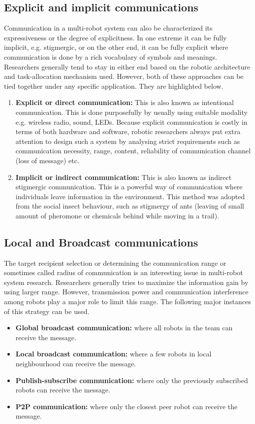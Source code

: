 \subsection*{Explicit and implicit communications}
Communication in a multi-robot system can also be characterized its expressiveness or the degree of explicitness. In one extreme it can be fully implicit, e.g. stigmergic, or on the other end, it can be fully explicit where communication is done by a rich vocabulary of symbols and meanings. Researchers generally tend to stay in either end based on the robotic architecture and task-allocation mechanism used. However, both of these approaches can be tied together under any specific application. They are highlighted below.
\begin{enumerate}
\item \textbf{Explicit or direct communication: }
This is also known as intentional communication. This is done purposefully by usually using suitable modality e.g. wireless radio, sound, LEDs. Because explicit communication is costly in terms of both hardware and software, robotic researchers always put extra attention to design such a system by analysing strict requirements such as communication necessity, range, content, reliability of communication channel (loss of message) etc.
%
\item \textbf{Implicit or indirect communication:} 
This is also known as indirect stigmergic communication. This is a powerful way of communication where individuals leave information in the environment. This method was adopted from the social insect behaviour, such as stigmergy of ants (leaving of small amount of pheromone or chemicals behind while moving in a trail).
\end{enumerate}
\subsection*{Local and Broadcast communications}
The target recipient selection or determining the communication range or sometimes called radius of communication is an interesting issue in multi-robot system research. Researchers generally tries to maximize the information gain by using larger range. However, transmission power and communication interference among robots play a major role to limit this range. The following major instances of this strategy can be used.
\begin{itemize}
\item \textbf{Global broadcast communication:} where all robots in the team can receive the message.
\item \textbf{Local broadcast communication:} where a few robots in local neighbourhood can receive the message.
\item \textbf{Publish-subscribe communication:} where only the previously subscribed robots can receive the message.
\item \textbf{P2P communication:} where only the closest peer robot can receive the message.
\end{itemize}
